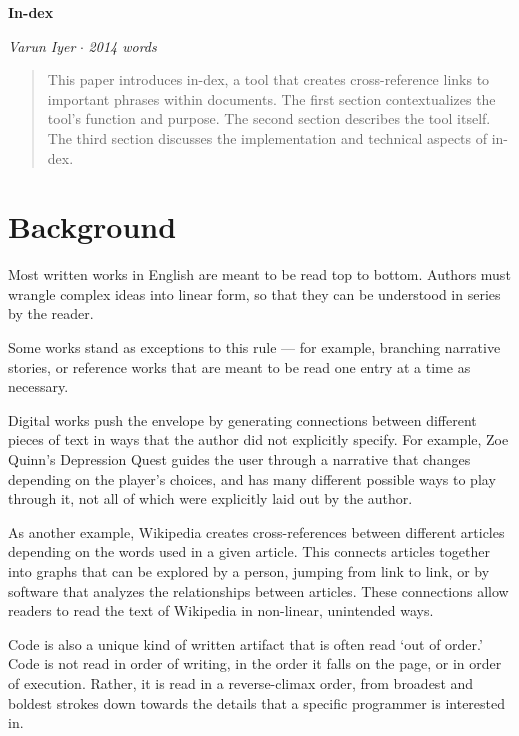 \documentclass[12pt]{article}
\begin{document}

	\begin{center}
		\textbf{In-dex}

		\emph{Varun Iyer} \hspace{.34em}$\cdot$\hspace{.34em} \emph{2014 words}
	\end{center}
	\par

	\begin{abstract}
		This paper introduces in-dex, a tool that creates cross-reference links
		to important phrases within documents. The first section contextualizes
		the tool’s function and purpose. The second section describes the tool
		itself. The third section discusses the implementation and technical
		aspects of in-dex.
	\end{abstract}

	\section{Background}

	Most written works in English are meant to be read top to bottom.
	Authors must wrangle complex ideas into linear form, so that they can be
	understood in series by the reader.

	Some works stand as exceptions to this rule --- for example, branching
	narrative stories, or reference works that are meant to be read one entry
	at a time as necessary.

	Digital works push the envelope by generating connections between different
	pieces of text in ways that the author did not explicitly specify. For
	example, Zoe Quinn’s Depression Quest guides the user through a narrative
	that changes depending on the player’s choices, and has many different
	possible ways to play through it, not all of which were explicitly laid out
	by the author.\autocite{dq}

	As another example, Wikipedia creates cross-references between different
	articles depending on the words used in a given article. This connects
	articles together into graphs that can be explored by a person, jumping
	from link to link, or by software that analyzes the relationships between
	articles.\autocite{wiki} These connections allow readers to read the text
	of Wikipedia in non-linear, unintended ways.

	Code is also a unique kind of written artifact that is often read ‘out of
	order.’ Code is not read in order of writing, in the order it falls on
	the page, or in order of execution. Rather, it is read in a reverse-climax
	order, from broadest and boldest strokes down towards the details that a
	specific programmer is interested in.\autocite[140]{brock}
\end{document}
